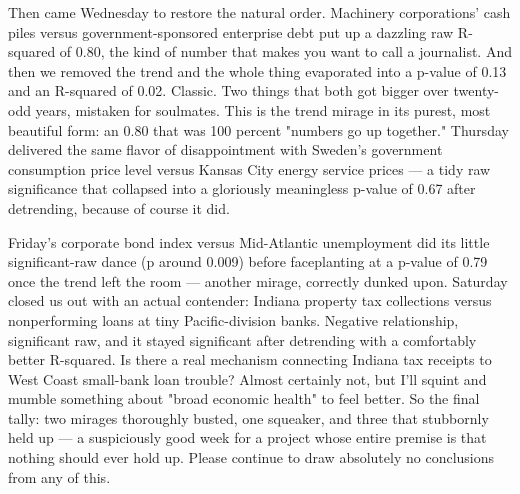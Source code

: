 Then came Wednesday to restore the natural order. Machinery corporations' cash piles versus government-sponsored enterprise debt put up a dazzling raw R-squared of 0.80, the kind of number that makes you want to call a journalist. And then we removed the trend and the whole thing evaporated into a p-value of 0.13 and an R-squared of 0.02. Classic. Two things that both got bigger over twenty-odd years, mistaken for soulmates. This is the trend mirage in its purest, most beautiful form: an 0.80 that was 100 percent "numbers go up together." Thursday delivered the same flavor of disappointment with Sweden's government consumption price level versus Kansas City energy service prices — a tidy raw significance that collapsed into a gloriously meaningless p-value of 0.67 after detrending, because of course it did.

Friday's corporate bond index versus Mid-Atlantic unemployment did its little significant-raw dance (p around 0.009) before faceplanting at a p-value of 0.79 once the trend left the room — another mirage, correctly dunked upon. Saturday closed us out with an actual contender: Indiana property tax collections versus nonperforming loans at tiny Pacific-division banks. Negative relationship, significant raw, and it stayed significant after detrending with a comfortably better R-squared. Is there a real mechanism connecting Indiana tax receipts to West Coast small-bank loan trouble? Almost certainly not, but I'll squint and mumble something about "broad economic health" to feel better. So the final tally: two mirages thoroughly busted, one squeaker, and three that stubbornly held up — a suspiciously good week for a project whose entire premise is that nothing should ever hold up. Please continue to draw absolutely no conclusions from any of this.
